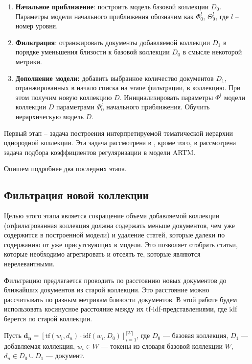 \begin{enumerate}
	\item \textbf{Начальное приближение}: построить модель базовой коллекции $D_0$. Параметры модели начального приближения обозначим как $\Phi_0^l$, $\Theta_0^l$, где $l$ -- номер уровня. 
	\item \textbf{Фильтрация}: отранжировать документы добавляемой коллекции $D_1$ в порядке уменьшения близости к базовой коллекции $D_0$ в смысле некоторой метрики.
	
	\item \textbf{Дополнение модели:} добавить выбранное количество документов $D_1$, отранжированных в начало списка на этапе фильтрации, в коллекцию. При этом получим новую коллекцию $D$. Инициализировать параметры $\Phi^l$ модели коллекции $D$ параметрами $\Phi_0^l$ начального приближения. Обучить иерархическую модель $D$.
	 
\end{enumerate}

Первый этап -- задача построения интерпретируемой тематической иерархии однородной коллекции. Эта задача рассмотрена в \cite{hARTM}, кроме того, в \cite{Ianina2017} рассмотрена задача подбора коэффициентов регуляризации в модели ARTM. 

Опишем подробнее два последних этапа.

\subsection{Фильтрация новой коллекции}
Целью этого этапа является сокращение объема добавляемой коллекции (отфильтрованная коллекция должна содержать меньше документов, чем уже содержится в построенной модели) и удаление статей, которые далеки по содержанию от уже присутсвующих в модели. Это позволяет отобрать статьи, которые необходимо агрегировать и отсеять те, которые являются нерелевантными.

Фильтрацию предлагается проводить по расстоянию новых документов до ближайших документов из старой коллекции. Это расстояние можно рассчитывать по разным метрикам близости документов. В этой работе будем использовать косинусное расстояние между их tf-idf-представлениями, где idf берется по старой коллекции.

Пусть $\boldsymbol{d_n }= [ \text{tf}(w_i, d_n) \cdot \text{idf}(w_i, D_0) ]_{i=1}^{|W|}$, где $D_0$ --- базовая коллекция, $D_1$ --- добавляемая коллекция, $w_i \in W$ --- токены из словаря базовой коллекции $W$, $d_n \in D_0 \cup D_1$ --- документ.

